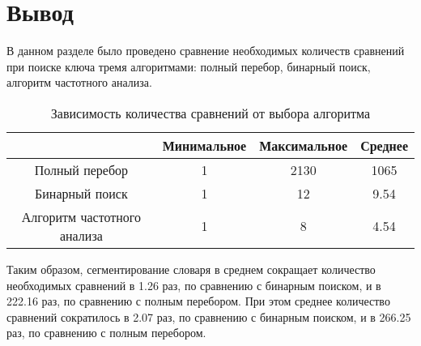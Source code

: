 
\clearpage



\captionsetup{singlelinecheck = false, justification=raggedright}
\section{Вывод}

В данном разделе было проведено сравнение необходимых количеств сравнений при поиске ключа тремя алгоритмами: полный перебор, бинарный поиск, алгоритм частотного анализа.

\begin{table}[h]
	\begin{center}
		\caption{\label{tabular: exp} Зависимость количества сравнений от выбора алгоритма}
		\begin{tabular}{ | c | c | c | c | }
			\hline
			& Минимальное & Максимальное & Среднее \\ \hline
			Полный перебор & 1 & 2130 & 1065 \\ \hline
			Бинарный поиск & 1 & 12 & 9.54  \\ \hline
			Алгоритм частотного анализа& 1 & 8 & 4.54 \\ \hline
		\end{tabular}
	\end{center}
\end{table}

Таким образом, сегментирование словаря в среднем сокращает количество необходимых сравнений в 1.26 раз, по сравнению с бинарным поиском, и в 222.16 раз, по сравнению с полным перебором. При этом среднее количество сравнений сократилось в 2.07 раз, по сравнению с бинарным поиском, и в 266.25 раз, по сравнению с полным перебором.





